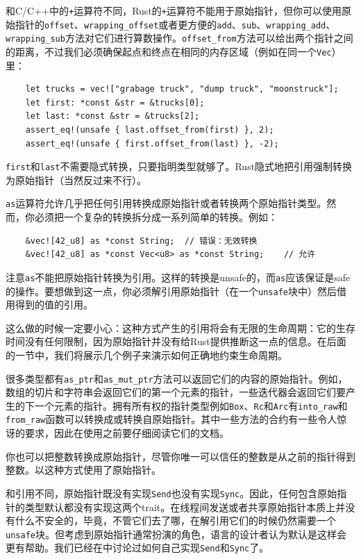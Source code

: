 和C/C++中的\texttt{+}运算符不同，Rust的\texttt{+}运算符不能用于原始指针，但你可以使用原始指针的\texttt{offset}、\texttt{wrapping\_offset}或者更方便的\texttt{add}、\texttt{sub}、\texttt{wrapping\_add}、\texttt{wrapping\_sub}方法对它们进行算数操作。\texttt{offset\_from}方法可以给出两个指针之间的距离，不过我们必须确保起点和终点在相同的内存区域（例如在同一个\texttt{Vec}）里：
\begin{verbatim}
    let trucks = vec!["grabage truck", "dump truck", "moonstruck"];
    let first: *const &str = &trucks[0];
    let last: *const &str = &trucks[2];
    assert_eq!(unsafe { last.offset_from(first) }, 2);
    assert_eq!(unsafe { first.offset_from(last) }, -2);
\end{verbatim}

\texttt{first}和\texttt{last}不需要隐式转换，只要指明类型就够了。Rust隐式地把引用强制转换为原始指针（当然反过来不行）。

\texttt{as}运算符允许几乎把任何引用转换成原始指针或者转换两个原始指针类型。然而，你必须把一个复杂的转换拆分成一系列简单的转换。例如：
\begin{verbatim}
    &vec![42_u8] as *const String;  // 错误：无效转换
    &vec![42_u8] as *const Vec<u8> as *const String;    // 允许
\end{verbatim}

注意\texttt{as}不能把原始指针转换为引用。这样的转换是unsafe的，而\texttt{as}应该保证是safe的操作。要想做到这一点，你必须解引用原始指针（在一个\texttt{unsafe}块中）然后借用得到的值的引用。

这么做的时候一定要小心：这种方式产生的引用将会有无限的生命周期：它的生存时间没有任何限制，因为原始指针并没有给Rust提供推断这一点的信息。在后面的一节中，我们将展示几个例子来演示如何正确地约束生命周期。

很多类型都有\texttt{as\_ptr}和\texttt{as\_mut\_ptr}方法可以返回它们的内容的原始指针。例如，数组的切片和字符串会返回它们的第一个元素的指针，一些迭代器会返回它们要产生的下一个元素的指针。拥有所有权的指针类型例如\texttt{Box}、\texttt{Rc}和\texttt{Arc}有\texttt{into\_raw}和\texttt{from\_raw}函数可以转换成或转换自原始指针。其中一些方法的合约有一些令人惊讶的要求，因此在使用之前要仔细阅读它们的文档。

你也可以把整数转换成原始指针，尽管你唯一可以信任的整数是从之前的指针得到整数。以这种方式使用了原始指针。

和引用不同，原始指针既没有实现\texttt{Send}也没有实现\texttt{Sync}。因此，任何包含原始指针的类型默认都没有实现这两个trait。在线程间发送或者共享原始指针本质上并没有什么不安全的，毕竟，不管它们去了哪，在解引用它们的时候仍然需要一个\texttt{unsafe}块。但考虑到原始指针通常扮演的角色，语言的设计者认为默认是这样会更有帮助。我们已经在中讨论过如何自己实现\texttt{Send}和\texttt{Sync}了。

